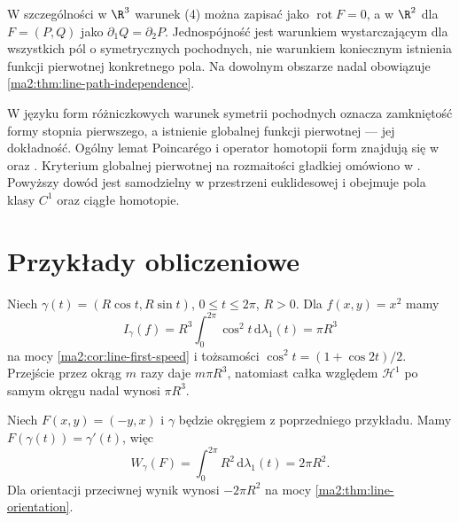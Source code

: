 W szczególności w $\R^3$ warunek (4)
można zapisać jako $\operatorname{rot}F=0$,
a w $\R^2$ dla $F=(P,Q)$ jako
$\partial_1Q=\partial_2P$.
Jednospójność jest warunkiem wystarczającym
dla wszystkich pól o symetrycznych pochodnych,
nie warunkiem koniecznym istnienia funkcji
pierwotnej konkretnego pola.
Na dowolnym obszarze nadal obowiązuje
\ref{ma2:thm:line-path-independence}.

W języku form różniczkowych warunek symetrii
pochodnych oznacza zamkniętość formy stopnia
pierwszego, a istnienie globalnej funkcji
pierwotnej --- jej dokładność.
Ogólny lemat Poincarégo i operator homotopii form
znajdują się w
oraz
.
Kryterium globalnej pierwotnej na rozmaitości
gładkiej omówiono w
.
Powyższy dowód jest samodzielny w przestrzeni
euklidesowej i obejmuje pola klasy $C^1$
oraz ciągłe homotopie.

\section{Przykłady obliczeniowe}

\begin{przyklad}
\label{ma2:ex:line-circle-first}
Niech $\gamma(t)=(R\cos t,R\sin t)$,
$0\le t\le2\pi$, $R>0$.
Dla $f(x,y)=x^2$ mamy
\[
 I_\gamma(f)=R^3\int_0^{2\pi}\cos^2t\,
 \mathrm d\lambda_1(t)=\pi R^3
\]
na mocy \ref{ma2:cor:line-first-speed}
i tożsamości $\cos^2t=(1+\cos 2t)/2$.
Przejście przez okrąg $m$ razy daje
$m\pi R^3$, natomiast całka względem
$\mathcal H^1$ po samym okręgu nadal
wynosi $\pi R^3$.
\end{przyklad}

\begin{przyklad}
\label{ma2:ex:line-circle-second}
Niech $F(x,y)=(-y,x)$ i $\gamma$ będzie
okręgiem z poprzedniego przykładu.
Mamy $F(\gamma(t))=\gamma'(t)$, więc
\[
 W_\gamma(F)=\int_0^{2\pi}R^2\,
 \mathrm d\lambda_1(t)=2\pi R^2.
\]
Dla orientacji przeciwnej wynik wynosi
$-2\pi R^2$ na mocy
\ref{ma2:thm:line-orientation}.
\end{przyklad}

